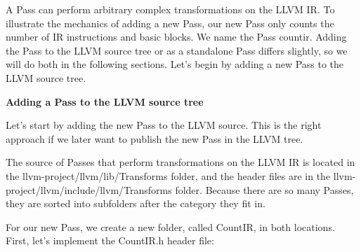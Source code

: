 
A Pass can perform arbitrary complex transformations on the LLVM IR. To illustrate the mechanics of adding a new Pass, our new Pass only counts the number of IR instructions and basic blocks. We name the Pass countir. Adding the Pass to the LLVM source tree or as a standalone Pass differs slightly, so we will do both in the following sections. Let's begin by adding a new Pass to the LLVM source tree.\par

\hspace*{\fill} \par %
\textbf{Adding a Pass to the LLVM source tree}

Let's start by adding the new Pass to the LLVM source. This is the right approach if we later want to publish the new Pass in the LLVM tree.\par

The source of Passes that perform transformations on the LLVM IR is located in the llvm-project/llvm/lib/Transforms folder, and the header files are in the llvm-project/llvm/include/llvm/Transforms folder. Because there are so many Passes, they are sorted into subfolders after the category they fit in.\par

For our new Pass, we create a new folder, called CountIR, in both locations. First, let's implement the CountIR.h header file:\par

